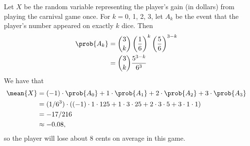 Let $X$ be the random variable representing the player's gain (in dollars) from playing the carnival game once.
For $k=0$, 1, 2, 3, let $A_k$ be the event that the player's number appeared on exactly $k$ dice.
Then
\begin{align*}
    \prob{A_k} &= \binom{3}{k}\left(\frac{1}{6}\right)^k\left(\frac{5}{6}\right)^{3-k} \\
    &= \binom{3}{k}\frac{5^{3-k}}{6^3}
\end{align*}
We have that
\begin{align*}
    \mean{X} &= (-1)\cdot\prob{A_0}+1\cdot\prob{A_1}+2\cdot\prob{A_2}+3\cdot\prob{A_3} \\
    &= (1/6^3)\cdot((-1)\cdot1\cdot125+1\cdot3\cdot25+2\cdot3\cdot5+3\cdot1\cdot1) \\
    &= -17/216 \\
    &\approx -0.08,
\end{align*}
so the player will lose about 8 cents on average in this game.
